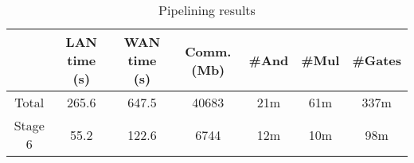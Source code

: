 \begin{table*}
\begin{tabular}{c|c|c|c |c|c|c}
           &  LAN time (s) & WAN time (s) & Comm. (Mb)  & \#And & \#Mul & \#Gates \\
\hline
Total      &  265.6       & 647.5        & 40683       & 21m    & 61m    &  337m  \\
\hline
Stage 6    &  55.2        & 122.6        & 6744        & 12m    & 10m   &  98m  \\
\hline
\end{tabular}

 \caption{Pipelining results}
 \label{tab:cifar} 
\end{table*}

